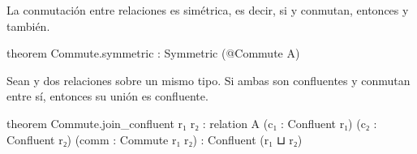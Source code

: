 \begin{thm}
La conmutación entre relaciones es simétrica, es decir, 
si  y  conmutan, 
entonces  y  también.
\begin{leancode}
theorem Commute.symmetric : Symmetric (@Commute A)
\end{leancode}
\end{thm}

\begin{thm}
Sean  y  dos relaciones sobre un mismo tipo. Si ambas son
confluentes y conmutan entre sí, entonces su unión  es
confluente.
\begin{leancode}
theorem Commute.join_confluent {r₁ r₂ : relation A} 
  (c₁ : Confluent r₁) (c₂ : Confluent r₂) (comm : Commute r₁ r₂) : 
    Confluent (r₁ ⊔ r₂)
\end{leancode}

\end{thm}

